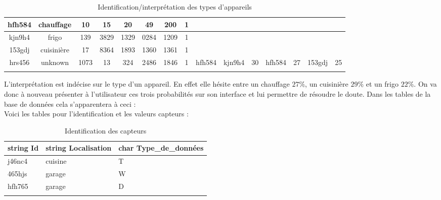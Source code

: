 \documentclass[10pt,a4paper]{article}
\begin{document}
\begin{table}[h]
{\begin{tabular}{|c|c|c|c|c|c|c|c|c|c|c|c|c|c|c|}
hfh584 & chauffage & 10 & 15 & 20 & 49 & 200 & 1 &  &  &  &  &  &  &  \\ \hline
kjn9h4 & frigo & 139 & 3829 & 1329 & 0284 & 1209 & 1 &  &  &  &  &  &  &  \\ \hline
153gdj & cuisinière & 17 & 8364 & 1893 & 1360 & 1361 & 1 &  &  &  &  &  &  &  \\ \hline
hrs456 & unknown & 1073 & 13 & 324 & 2486 & 1846 & 1 & hfh584 & kjn9h4 & 30 & hfh584 & 27 & 153gdj & 25 \\ \hline
 &  &  &  &  &  &  &  &  &  &  &  &  &  & 
\end{tabular}
}
\caption{Identification/interprétation des types d'appareils}
\end{table}

\newpage
L'interprétation est indécise sur le type d'un appareil. En effet elle hésite entre un chauffage $27\%$, un cuisinière $29\%$ et un frigo $22\%$. On va donc à nouveau présenter à l'utilisateur ces trois probabilités sur son interface et lui permettre de résoudre le doute. Dans les tables de la base de données cela s'apparentera à ceci :\\

Voici les tables pour l'identification et les valeurs capteurs :
\begin{table}[h!]
    \centering
    \begin{tabular}{|l|l|l|}
    \hline
    \rowcolor[HTML]{EFEFEF} 
    string Id & string Localisation & char Type\_de\_données \\ \hline
    j46nc4    & cuisine             & T                      \\ \hline
    465hjs    & garage              & W                      \\ \hline
    hfh765    & garage              & D                      \\ \hline
              &                     &                       
    \end{tabular}
    \caption{Identification des capteurs}
\end{table}
\end{document}
